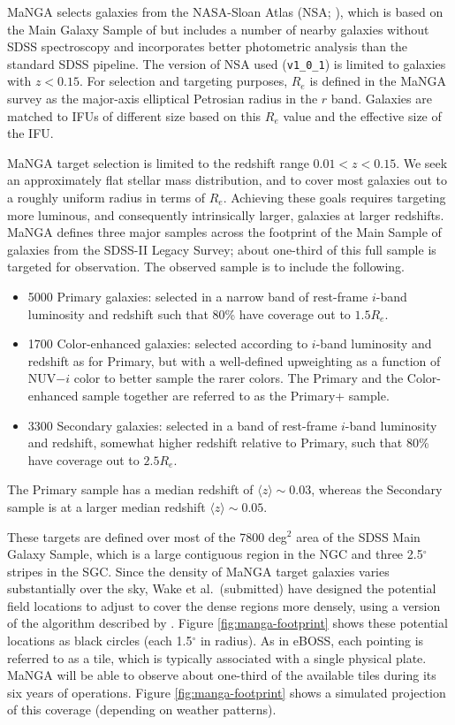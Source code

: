 MaNGA selects galaxies from the NASA-Sloan Atlas (NSA;
\citealt{blanton11a}), which is based on the Main Galaxy Sample of
\citet{strauss02a} but includes a number of nearby galaxies without
SDSS spectroscopy and incorporates better photometric analysis than
the standard SDSS pipeline.  The version of NSA used ({\tt v1\_0\_1})
is limited to galaxies with $z<0.15$.  For selection and targeting
purposes, $R_e$ is defined in the MaNGA survey as the major-axis
elliptical Petrosian radius in the $r$ band.  Galaxies are matched to
IFUs of different size based on this $R_e$ value and the effective
size of the IFU.

MaNGA target selection is limited to the redshift range
$0.01<z<0.15$. We seek an approximately flat stellar mass
distribution, and to cover most galaxies out to a roughly uniform
radius in terms of $R_e$. Achieving these goals requires targeting
more luminous, and consequently intrinsically larger, galaxies at
larger redshifts.  MaNGA defines three major samples across the
footprint of the Main Sample of galaxies from the SDSS-II Legacy
Survey; about one-third of this full sample is targeted for
observation. The observed sample is to include the following.
\begin{itemize}
\item 5000 Primary galaxies: selected in a narrow band of rest-frame
  $i$-band luminosity and redshift such that 80\% have coverage out to
  $1.5 R_e$.
\item 1700 Color-enhanced galaxies: selected according to $i$-band
  luminosity and redshift as for Primary, but with a well-defined
  upweighting as a function of NUV$-i$ color to better sample the
  rarer colors. The Primary and the Color-enhanced sample together
  are referred to as the Primary+ sample.
\item 3300 Secondary galaxies: selected in a band of rest-frame
  $i$-band luminosity and redshift, somewhat higher redshift relative
  to Primary, such that 80\% have coverage out to $2.5R_e$.
\end{itemize}
The Primary sample has a median redshift of $\langle
z\rangle\sim 0.03$, whereas the Secondary sample is at a larger median
redshift $\langle z\rangle\sim 0.05$. 

These targets are defined over most of the 7800 deg$^{2}$ area of the
SDSS Main Galaxy Sample, which is a large contiguous region in the NGC
and three 2.5$^\circ$ stripes in the SGC. Since the density of MaNGA
target galaxies varies substantially over the sky, Wake et
al.~(submitted) have designed the potential field locations to adjust
to cover the dense regions more densely, using a version of the
algorithm described by \citet{blanton03a}.  Figure
\ref{fig:manga-footprint} shows these potential locations as black
circles (each 1.5$^\circ$ in radius). As in eBOSS, each pointing is
referred to as a tile, which is typically associated with a single
physical plate.  MaNGA will be able to observe about one-third of the
available tiles during its six years of operations. Figure
\ref{fig:manga-footprint} shows a simulated projection of this
coverage (depending on weather patterns).

